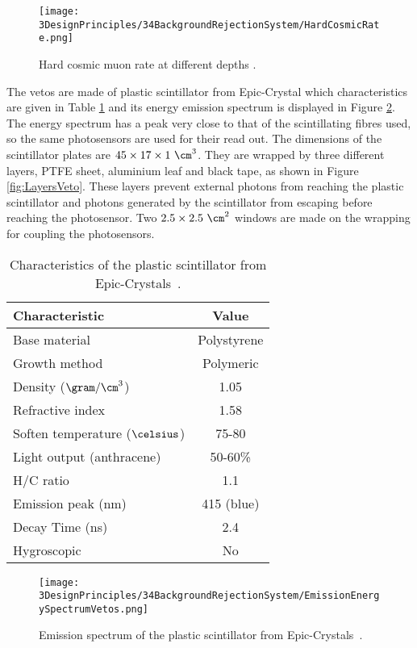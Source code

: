 \begin{figure}[h]
\centering
\texttt{[image: 3DesignPrinciples/34BackgroundRejectionSystem/HardCosmicRate.png]}
\caption{Hard cosmic muon rate at different depths \cite{HardCosmicMuonRatePlot}.\label{fig:HardCoscmicRate}}
\end{figure}

The vetos are made of plastic scintillator from Epic-Crystal \cite{ScintillatorVeto} which characteristics are given in Table \ref{tab:ParametersScintillatorVeto} and its energy emission spectrum is displayed in Figure \ref{fig:EmissionEnergySpectrumVeto}. The energy spectrum has a peak very close to that of the scintillating fibres used, so the same photosensors are used for their read out. The dimensions of the scintillator plates are $45 \times 17 \times 1~\cm^3$. They are wrapped by three different layers, PTFE sheet, aluminium leaf and black tape, as shown in Figure \ref{fig:LayersVeto}. These layers prevent external photons from reaching the plastic scintillator and photons generated by the scintillator from escaping before reaching the photosensor. Two $2.5\times 2.5 ~\cm^2$ windows are made on the wrapping for coupling the photosensors.

\begin{table}[htbp]
\centering{}%
\begin{tabular}{lc}
\toprule 
Characteristic & Value \tabularnewline
\midrule
\midrule 
Base material & Polystyrene \tabularnewline
Growth method & Polymeric \tabularnewline
Density ($\gram/\cm^3$)& 1.05 \tabularnewline
Refractive index & 1.58 \tabularnewline
Soften temperature ($\celsius$) & 75-80 \tabularnewline
Light output (anthracene) & 50-60\% \tabularnewline
H/C ratio & 1.1 \tabularnewline
Emission peak (nm) & 415 (blue) \tabularnewline
Decay Time (ns) & 2.4 \tabularnewline
Hygroscopic & No \tabularnewline
\bottomrule
\end{tabular}
\caption{Characteristics of the plastic scintillator from Epic-Crystals~\cite{ScintillatorVeto}.}
\label{tab:ParametersScintillatorVeto}
\end{table}

\begin{figure}[]
\centering
\texttt{[image: 3DesignPrinciples/34BackgroundRejectionSystem/EmissionEnergySpectrumVetos.png]}
\caption{Emission spectrum of the plastic scintillator from \newline Epic-Crystals\label{fig:EmissionEnergySpectrumVeto}~\cite{ScintillatorVeto}.}
\end{figure}

